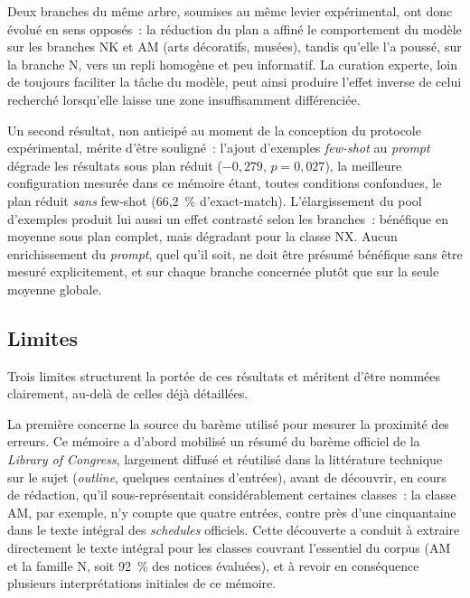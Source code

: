 Deux branches du même arbre, soumises au même levier expérimental, ont donc évolué en sens opposés~: la réduction du plan a affiné le comportement du modèle sur les branches NK et AM (arts décoratifs, musées), tandis qu'elle l'a poussé, sur la branche N, vers un repli homogène et peu informatif. La curation experte, loin de toujours faciliter la tâche du modèle, peut ainsi produire l'effet inverse de celui recherché lorsqu'elle laisse une zone insuffisamment différenciée.

Un second résultat, non anticipé au moment de la conception du protocole expérimental, mérite d'être souligné~: l'ajout d'exemples \textit{few-shot} au \textit{prompt} dégrade les résultats sous plan réduit ($-0,279$, $p = 0,027$), la meilleure configuration mesurée dans ce mémoire étant, toutes conditions confondues, le plan réduit \emph{sans} few-shot (66,2~\% d'exact-match). L'élargissement du pool d'exemples produit lui aussi un effet contrasté selon les branches~: bénéfique en moyenne sous plan complet, mais dégradant pour la classe NX. Aucun enrichissement du \textit{prompt}, quel qu'il soit, ne doit être présumé bénéfique sans être mesuré explicitement, et sur chaque branche concernée plutôt que sur la seule moyenne globale.

\subsection*{Limites}

Trois limites structurent la portée de ces résultats et méritent d'être nommées clairement, au-delà de celles déjà détaillées.

La première concerne la source du barème utilisé pour mesurer la proximité des erreurs. Ce mémoire a d'abord mobilisé un résumé du barème officiel de la \textit{Library of Congress}, largement diffusé et réutilisé dans la littérature technique sur le sujet (\textit{outline}, quelques centaines d'entrées), avant de découvrir, en cours de rédaction, qu'il sous-représentait considérablement certaines classes~: la classe AM, par exemple, n'y compte que quatre entrées, contre près d'une cinquantaine dans le texte intégral des \textit{schedules} officiels. Cette découverte a conduit à extraire directement le texte intégral pour les classes couvrant l'essentiel du corpus (AM et la famille N, soit 92~\% des notices évaluées), et à revoir en conséquence plusieurs interprétations initiales de ce mémoire.

